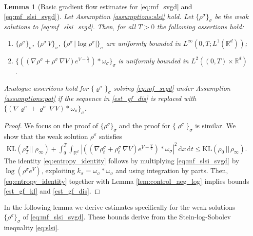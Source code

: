 \documentclass[reqno, 11pt]{amsart}
\numberwithin{equation}{section}
\newtheorem{lem}[thm]{Lemma}
\theoremstyle{definition}
\begin{document}
\begin{lem}[Basic gradient flow estimates for \eqref{eq:mf_svgd} and \eqref{eq:mf_slsi_svgd}]
    \label{lem:gf_est} Let Assumption \ref{assumptions:slsi} hold. Let $\{\rho^\sigma\}_\sigma$ be the weak solutions to \eqref{eq:mf_slsi_svgd}. Then, for all $T>0$ the following assertions hold:
    \begin{enumerate}[label=(GF\arabic*)]
        \item\label{est_gf_kl} $\{\rho^\sigma\}_\sigma$, $\{\rho^\sigma\,V\}_\sigma$, $\{\rho^\sigma\,|\log\rho^\sigma|\}_\sigma$ are uniformly bounded in $L^{\infty}(0,T; L^1(\mathbb{R}^d))$;
        \item\label{est_gf_dis} $\{((\nabla \rho^\sigma + \rho^\sigma \, \nabla V)e^{V-\frac{\mathbb{V}}{2}})\ast \omega_\sigma \}_\sigma$ is uniformly bounded in $L^2((0,T)\times \mathbb{R}^d)$.
    \end{enumerate}
    Analogue assertions hold for $\{\varrho^\sigma\}_\sigma$ solving \eqref{eq:mf_svgd} under Assumption \ref{assumptions:pot} if the sequence in \ref{est_gf_dis} is replaced with $\{(\nabla \varrho^\sigma + \varrho^\sigma \, \nabla V)\ast \omega_\sigma \}_\sigma$.
\end{lem}
\begin{proof}
    We focus on the proof of $\{\rho^\sigma\}_\sigma$ and the proof for $\{\varrho^\sigma\}_\sigma$ is similar. We show that the weak solution $\rho^{\sigma}$ satisfies
    \begin{align}
        \label{eq:entropy_identity}
        \mathrm{KL}(\rho_T^\sigma\,||\, \rho_\infty) + \int_0^T \int_{\mathbb{R}^{d}} |((\nabla \rho_t^\sigma + \rho_t^\sigma \, \nabla V)e^{V-\frac{\mathbb{V}}{2}})\ast\omega_\sigma|^2 \,\mathrm{d} x\,\mathrm{d} t \leq \mathrm{KL}(\rho_0 \,||\,\rho_\infty).
    \end{align}
    The identity \eqref{eq:entropy_identity} follows by multiplying \eqref{eq:mf_slsi_svgd} by $\log(\rho^\sigma e^{V})$, exploiting $k_{\sigma}=\omega_{\sigma}\ast\omega_{\sigma}$ and using integration by parts. Then, \eqref{eq:entropy_identity} together with Lemma \ref{lem:control_neg_log} implies bounds \ref{est_gf_kl} and \ref{est_gf_dis}.
\end{proof}

In the following lemma we derive estimates specifically for the weak solutions $\{\rho^\sigma\}_\sigma$ of \eqref{eq:mf_slsi_svgd}. These bounds derive from the Stein-log-Sobolev inequality \eqref{eq:slsi}.
\end{document}
